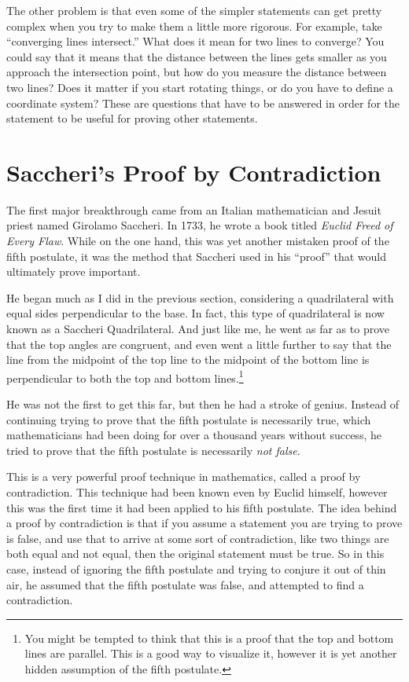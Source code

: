 \documentclass[12pt]{article}
\begin{document}
The other problem is that even some of the simpler statements can get pretty complex when you try to make them a little more rigorous. For example, take ``converging lines intersect.'' What does it mean for two lines to converge? You could say that it means that the distance between the lines gets smaller as you approach the intersection point, but how do you measure the distance between two lines? Does it matter if you start rotating things, or do you have to define a coordinate system? These are questions that have to be answered in order for the statement to be useful for proving other statements.

\section*{Saccheri's Proof by Contradiction}

The first major breakthrough came from an Italian mathematician and Jesuit priest named Girolamo Saccheri. In 1733, he wrote a book titled \textit{Euclid Freed of Every Flaw}. While on the one hand, this was yet another mistaken proof of the fifth postulate, it was the method that Saccheri used in his ``proof'' that would ultimately prove important.

He began much as I did in the previous section, considering a quadrilateral with equal sides perpendicular to the base. In fact, this type of quadrilateral is now known as a Saccheri Quadrilateral. And just like me, he went as far as to prove that the top angles are congruent, and even went a little further to say that the line from the midpoint of the top line to the midpoint of the bottom line is perpendicular to both the top and bottom lines.\footnote{You might be tempted to think that this is a proof that the top and bottom lines are parallel. This is a good way to visualize it, however it is yet another hidden assumption of the fifth postulate.}

He was not the first to get this far, but then he had a stroke of genius. Instead of continuing trying to prove that the fifth postulate is necessarily true, which mathematicians had been doing for over a thousand years without success, he tried to prove that the fifth postulate is necessarily \textit{not false}.

This is a very powerful proof technique in mathematics, called a proof by contradiction. This technique had been known even by Euclid himself, however this was the first time it had been applied to his fifth postulate. The idea behind a proof by contradiction is that if you assume a statement you are trying to prove is false, and use that to arrive at some sort of contradiction, like two things are both equal and not equal, then the original statement must be true. So in this case, instead of ignoring the fifth postulate and trying to conjure it out of thin air, he assumed that the fifth postulate was false, and attempted to find a contradiction.
\end{document}
